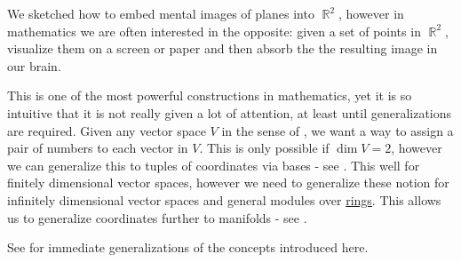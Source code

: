 \begin{remark}\label{rem:coordinate_systems}
  We sketched how to embed mental images of planes into \( \BbbR^2 \), however in mathematics we are often interested in the opposite: given a set of points in \( \BbbR^2 \), visualize them on a screen or paper and then absorb the the resulting image in our brain.

  This is one of the most powerful constructions in mathematics, yet it is so intuitive that it is not really given a lot of attention, at least until generalizations are required. Given any vector space \( V \) in the sense of , we want a way to assign a pair of numbers to each vector in \( V \). This is only possible if \( \dim V = 2 \), however we can generalize this to tuples of coordinates via bases - see . This well for finitely dimensional vector spaces, however we need to generalize these notion for infinitely dimensional vector spaces and general modules over \hyperref[def:left_module]{rings}. This allows us to generalize coordinates further to manifolds - see .

  See  for immediate generalizations of the concepts introduced here.
\end{remark}
